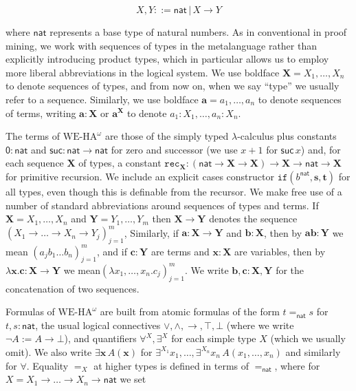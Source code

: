 \documentclass[10pt,a4paper]{article}
\begin{document}
\par  \quad  \[X,Y::=\mathsf{nat}\,|\,X\to Y\]\quad  \quad  
  
where $\mathsf{nat}$ represents a base type of natural numbers. As in conventional in proof mining, we work with sequences of types in the metalanguage rather than explicitly introducing product types, which in particular allows us to employ more liberal abbreviations in the logical system. We use boldface $\bm{X}=X_{1},\ldots,X_{n}$ to denote sequences of types, and from now on, when we say “type” we usually refer to a sequence. Similarly, we use boldface $\bm{a}=a_{1},\ldots,a_{n}$ to denote sequences of terms, writing $\bm{a}:\bm{X}$ or $\bm{a}^{\bm{X}}$ to denote $a_{1}:X_{1},\ldots,a_{n}:X_{n}$.\par
 
 
 
The terms of $\mathrm{WE}\mbox{-}\mathrm{HA}^{\omega}$ are those of the simply typed $\lambda$-calculus plus constants $\mathsf{0}:\mathsf{nat}$ and $\mathsf{suc}:\mathsf{nat}\to\mathsf{nat}$ for zero and successor (we use $x+1$ for $\mathsf{suc}\,x$) and, for each sequence $\bm{X}$ of types, a constant $\bm{\mathtt{rec}}_{\bm{X}}:(\mathsf{nat}\to\bm{X}\to\bm{X})\to\bm{X}\to\mathsf{nat}\to\bm{X}$ for primitive recursion. We include an explicit cases constructor $\mathtt{if}({b^{\mathsf{nat}}},{\bm{s}},{\bm{t}})$ for all types, even though this is definable from the recursor. We make free use of a number of standard abbreviations around sequences of types and terms. If $\bm{X}=X_{1},\ldots,X_{n}$ and $\bm{Y}=Y_{1},\ldots,Y_{m}$ then $\bm{X}\to\bm{Y}$ denotes the sequence $(X_{1}\to\ldots\to X_{n}\to Y_{j})^{m}_{j=1}$, Similarly, if $\bm{a}:\bm{X}\to\bm{Y}$ and $\bm{b}:\bm{X}$, then by $\bm{a}\bm{b}:\bm{Y}$ we mean $(a_{j}b_{1}\ldots b_{n})^{m}_{j=1}$, and if $\bm{c}:\bm{Y}$ are terms and $\bm{x}:\bm{X}$ are variables, then by $\lambda\bm{x}.\bm{c}:\bm{X}\to\bm{Y}$ we mean$(\lambda x_{1},\ldots,x_{n}.c_{j})^{m}_{j=1}$. We write $\bm{b},\bm{c}:\bm{X},\bm{Y}$ for the concatenation of two sequences.\par
 
 
 
Formulas of $\mathrm{WE}\mbox{-}\mathrm{HA}^{\omega}$ are built from atomic formulas of the form $t=_{\mathsf{nat}}s$ for $t,s:\mathsf{nat}$, the usual logical connectives $\vee,\wedge,\to,\top,\bot$ (where we write $\neg A:=A\to\bot$), and quantifiers $\forall^{X},\exists^{X}$ for each simple type $X$ (which we usually omit). We also write $\exists\bm{x}\,A(\bm{x})$ for $\exists^{X_{1}}x_{1},\ldots,\exists^{X_{n}}x_{n}\,A(x_{1},\ldots,x_{n})$ and similarly for $\forall$. Equality $=_{X}$ at higher types is defined in terms of $=_{\mathsf{nat}}$, where for $X=X_{1}\to\ldots\to X_{n}\to\mathsf{nat}$ we set\par
  
\end{document}
